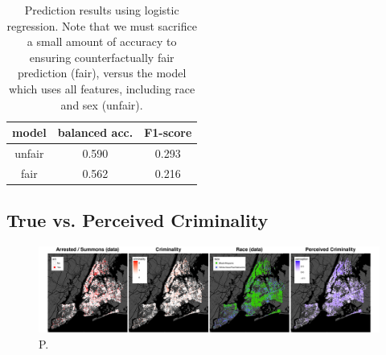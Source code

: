 \begin{table}[t]
\vspace{-2ex}
\caption{Prediction results using logistic regression. Note that we must sacrifice a small amount of accuracy to ensuring counterfactually fair prediction (fair), versus the model which uses all features, including race and sex (unfair).}
\vspace{-3ex}
\label{table.pred_law}
\begin{center}
\resizebox{\columnwidth}{!}
{
\begin{sc}
\footnotesize
\begin{tabular}{c|c|c}
\hline
\hline
model & balanced acc. & F1-score  \\
\hline
unfair & 0.590 & 0.293 \\ \hline
fair  &  0.562 & 0.216 \\
\hline
\end{tabular}
\end{sc}
}
\end{center}
\vspace{-4ex}
\end{table}


\subsection{True vs. Perceived Criminality}
\begin{figure}[th!]
\begin{center}
\vspace{-2ex}
\centerline{\includegraphics[width=\textwidth]{stop_and_frisk_graphs.png}}
\vspace{-2ex}
\caption{P.}
\label{figure.criminality}
\vspace{-2ex}
\end{center}
\end{figure}

